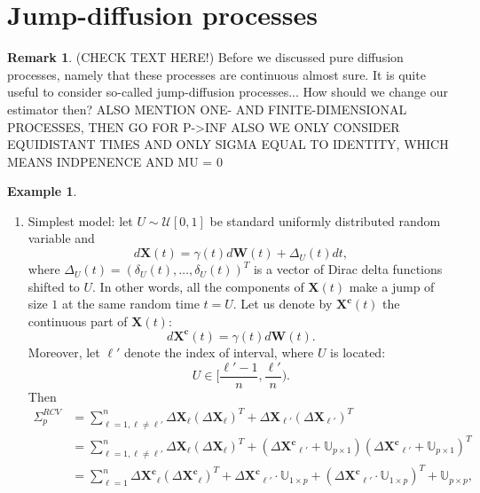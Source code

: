 \documentclass[a4paper,11pt]{article}
\theoremstyle{plain}
\theoremstyle{definition}
\newtheorem{exmp}[thm]{Example}
\newtheorem{rmrk}[thm]{Remark}
\begin{document}
    \pagebreak
    \part{Jump-diffusion processes}
    \begin{rmrk}
    	(CHECK TEXT HERE!)
    	Before we discussed pure diffusion processes, namely that these processes are continuous almost sure. It is quite useful to consider so-called jump-diffusion processes... How should we change our estimator then?
    	ALSO MENTION ONE- AND FINITE-DIMENSIONAL PROCESSES, THEN GO FOR P->INF
    	ALSO WE ONLY CONSIDER EQUIDISTANT TIMES
    	AND ONLY SIGMA EQUAL TO IDENTITY, WHICH MEANS INDPENENCE
    	AND MU = 0
    \end{rmrk}
    
    \begin{exmp} \label{uniform jumps} \
    	\begin{enumerate}
    		\item Simplest model: let $U \sim \mathcal{U}[0, 1]$ be standard uniformly distributed random variable and
    		\begin{equation}
    		d\mathbf{X}(t) = \gamma(t)  d\mathbf{W}(t) + \Delta_U(t)dt,
    		\end{equation}
    		where $\Delta_U(t) = (\delta_U(t), \dots, \delta_U(t))^T$ is a vector of Dirac delta functions shifted to $U$. In other words, all the components of $\mathbf{X}(t)$ make a jump of size $1$ at the same random time $t = U$. Let us denote by $\mathbf{X^c}(t)$ the continuous part of $\mathbf{X}(t)$:
    		\[ d\mathbf{X^c}(t) = \gamma(t) d\mathbf{W}(t). \]
    		Moreover, let $\ell'$ denote the index of interval, where $U$ is located:
    		\[ U \in \bigg[\frac{\ell'-1}{n}, \frac{\ell'}{n}\bigg). \]
    		Then
    		\[ 
    		\begin{aligned}
    		\Sigma_p^{RCV} & = \sum_{\ell=1, \ell \neq \ell'}^{n}\Delta \mathbf{X}_\ell(\Delta \mathbf{X}_\ell)^T + \Delta \mathbf{X}_{\ell'}(\Delta \mathbf{X}_{\ell'})^T\\
    		& = \sum_{\ell=1, \ell \neq \ell'}^{n}\Delta \mathbf{X}_\ell(\Delta \mathbf{X}_\ell)^T + (\Delta \mathbf{X^c}_{\ell'} + \mathbb{U}_{p \times 1})(\Delta \mathbf{X^c}_{\ell'} + \mathbb{U}_{p \times 1})^T\\
    		& =  \sum_{\ell=1}^{n}\Delta \mathbf{X^c}_\ell(\Delta \mathbf{X^c}_\ell)^T + \Delta \mathbf{X^c}_{\ell'} \cdot \mathbb{U}_{1 \times p} + (\Delta \mathbf{X^c}_{\ell'} \cdot \mathbb{U}_{1 \times p})^T + \mathbb{U}_{p \times p} ,
    		\end{aligned}
\]
\end{enumerate}
\end{exmp}
\end{document}
